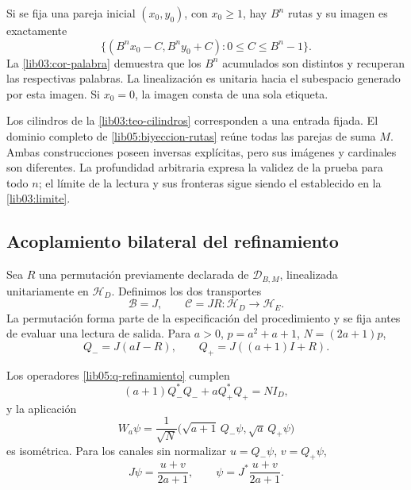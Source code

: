 Si se fija una pareja inicial \((x_0,y_0)\), con \(x_0\geq1\),
hay \(B^n\) rutas y su imagen es exactamente
\begin{equation}
 \bigl\{(B^nx_0-C,B^ny_0+C):0\leq C\leq B^n-1\bigr\}.
 \label{lib05:imagen-fija}
\end{equation}
La \cref{lib03:cor-palabra} demuestra que los \(B^n\)
acumulados son distintos y recuperan las respectivas palabras. La
linealización es unitaria hacia el subespacio generado por esta
imagen. Si \(x_0=0\), la imagen consta de una sola etiqueta.

Los cilindros de la \cref{lib03:teo-cilindros} corresponden a una
entrada fijada. El dominio completo de
\eqref{lib05:biyeccion-rutas} reúne todas las parejas de suma \(M\).
Ambas construcciones poseen inversas explícitas, pero sus imágenes
y cardinales son diferentes. La profundidad arbitraria expresa la
validez de la prueba para todo \(n\); el límite de la lectura y
sus fronteras sigue siendo el establecido en la
\cref{lib03:limite}.

\subsection{Acoplamiento bilateral del refinamiento}
\label{lib05:bilateral}

Sea \(R\) una permutación previamente declarada de
\(\mathcal D_{B,M}\), linealizada unitariamente en
\(\mathscr H_D\). Definimos los dos transportes
\begin{equation}
 \mathcal B=J,\qquad \mathcal C=JR:
            \mathscr H_D\longrightarrow\mathscr H_E.
 \label{lib05:dos-transportes}
\end{equation}
La permutación forma parte de la especificación del procedimiento
y se fija antes de evaluar una lectura de salida.
Para \(a>0\), \(p=a^2+a+1\), \(N=(2a+1)p\),
\begin{equation}
 Q_-=J(aI-R),\qquad Q_+=J((a+1)I+R).
 \label{lib05:q-refinamiento}
\end{equation}

\begin{proposition}
\label{lib05:prop-bilateral}
Los operadores \eqref{lib05:q-refinamiento} cumplen
\begin{equation}
 (a+1)Q_-^*Q_-+aQ_+^*Q_+=NI_D,
 \label{lib05:balance}
\end{equation}
y la aplicación
\begin{equation}
 W_a\psi=\frac1{\sqrt N}
    \bigl(\sqrt{a+1}\,Q_-\psi,\sqrt a\,Q_+\psi\bigr)
 \label{lib05:w}
\end{equation}
es isométrica. Para los canales sin normalizar
\(u=Q_-\psi\), \(v=Q_+\psi\),
\begin{equation}
 J\psi=\frac{u+v}{2a+1},\qquad
 \psi=J^*\frac{u+v}{2a+1}.
 \label{lib05:inversa-bilateral}
\end{equation}
\end{proposition}

